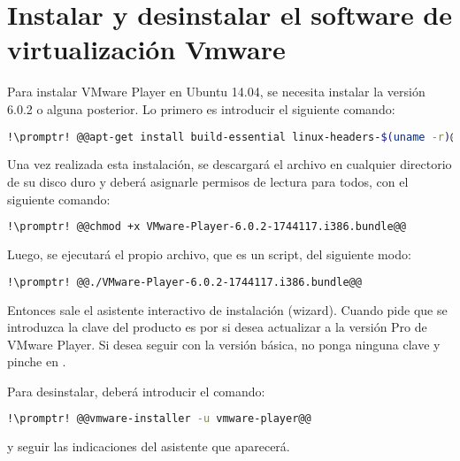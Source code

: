 \section{Instalar y desinstalar el software de virtualización Vmware}\label{sec:vmware}
Para instalar VMware Player en Ubuntu 14.04, se necesita instalar la versión 6.0.2 o alguna posterior. Lo
primero es introducir el siguiente comando:

\begin{lstlisting}[gobble=2,language=bash,style=bashinteract,escapechar=!]
  !\promptr! @@apt-get install build-essential linux-headers-$(uname -r)@@
\end{lstlisting}

\noindent Una vez realizada esta instalación, se descargará el archivo
 en cualquier directorio de su disco duro y deberá asignarle
permisos de lectura para todos, con el siguiente comando:

\begin{lstlisting}[gobble=2,language=bash,style=bashinteract,escapechar=!]
  !\promptr! @@chmod +x VMware-Player-6.0.2-1744117.i386.bundle@@
\end{lstlisting}

\noindent Luego, se ejecutará el propio archivo, que es un script, del siguiente modo:

\begin{lstlisting}[gobble=2,language=bash,style=bashinteract,escapechar=!]
  !\promptr! @@./VMware-Player-6.0.2-1744117.i386.bundle@@
\end{lstlisting}

\noindent Entonces sale el asistente interactivo de instalación (wizard). Cuando pide que se introduzca la
clave del producto es por si desea actualizar a la versión Pro de VMware Player. Si desea seguir con la
versión básica, no ponga ninguna clave y pinche en .

Para desinstalar, deberá introducir el comando:

\begin{lstlisting}[gobble=2,language=bash,style=bashinteract,escapechar=!]
  !\promptr! @@vmware-installer -u vmware-player@@
\end{lstlisting}

\noindent y seguir las indicaciones del asistente que aparecerá.

